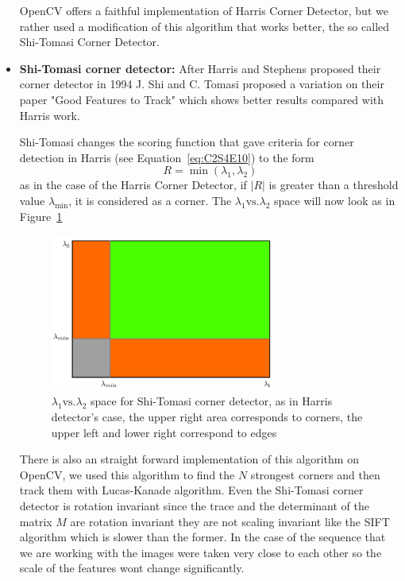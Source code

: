 \begin{itemize}
OpenCV offers a faithful implementation of Harris Corner Detector, but we rather used a modification of this algorithm that works better, the so called Shi-Tomasi Corner Detector.

\item \textbf{Shi-Tomasi corner detector:} After Harris and Stephens proposed their corner detector in 1994 J. Shi and C. Tomasi proposed a variation on their paper "Good Features to Track" \cite{ShiTomasi} which shows better results compared with Harris work. 

\bigskip

Shi-Tomasi changes the scoring function that gave criteria for corner detection in Harris (see Equation~\ref{eq:C2S4E10}) to the form
\begin{equation}
\label{eq:C2S4E11}
R = \min (\lambda_1,\lambda_2)
\end{equation}
as in the case of the Harris Corner Detector, if $|R|$ is greater than a threshold value $\lambda_{\min}$, it is considered as a corner. The $\lambda_1\text{vs.}\lambda_2$ space will now look as in Figure~\ref{fig:shitomasi_space}

\begin{figure}[h!]
\centering
\includegraphics[width=0.7\textwidth]{./Diagrams/shitomasi_space.png}
\caption{$\lambda_1\text{vs.}\lambda_2$ space for Shi-Tomasi corner detector, as in Harris detector's case, the upper right area corresponds to corners, the upper left and lower right correspond to edges}
\label{fig:shitomasi_space}
\end{figure}

There is also an straight forward implementation of this algorithm on OpenCV, we used this algorithm to find the $N$ strongest corners and then track them with Lucas-Kanade algorithm. Even the Shi-Tomasi corner detector is rotation invariant since the trace and the determinant of the matrix $M$ are rotation invariant they are not scaling invariant like the SIFT algorithm which is slower than the former. In the case of the sequence that we are working with the images were taken very close to each other so the scale of the features wont change significantly. 
\end{itemize}

